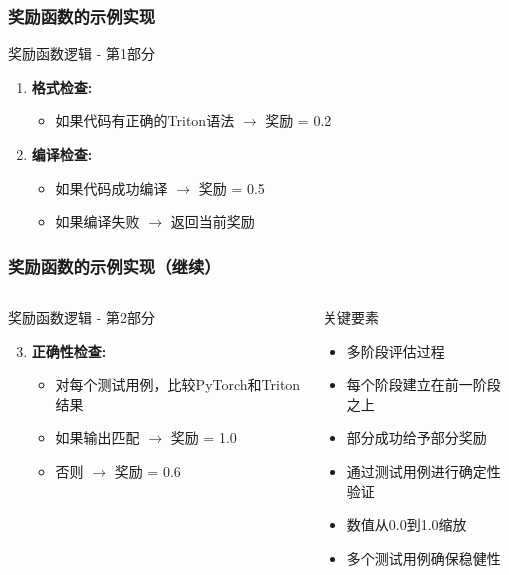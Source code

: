 \documentclass[aspectratio=169]{beamer}
\begin{document}
\begin{frame}
	\frametitle{奖励函数的示例实现}
	\begin{block}{奖励函数逻辑 - 第1部分}
		\begin{enumerate}
			\item \textbf{格式检查:}
			\begin{itemize}
				\item 如果代码有正确的Triton语法 $\rightarrow$ 奖励 = 0.2
			\end{itemize}
			\item \textbf{编译检查:}
			\begin{itemize}
				\item 如果代码成功编译 $\rightarrow$ 奖励 = 0.5
				\item 如果编译失败 $\rightarrow$ 返回当前奖励
			\end{itemize}
		\end{enumerate}
	\end{block}
\end{frame}

\begin{frame}
	\frametitle{奖励函数的示例实现（继续）}
	\begin{columns}
		\begin{column}{0.48\textwidth}
			\begin{block}{奖励函数逻辑 - 第2部分}
				\begin{enumerate}\setcounter{enumi}{2}
					\item \textbf{正确性检查:}
					\begin{itemize}
						\item 对每个测试用例，比较PyTorch和Triton结果
						\item 如果输出匹配 $\rightarrow$ 奖励 = 1.0
						\item 否则 $\rightarrow$ 奖励 = 0.6
					\end{itemize}
				\end{enumerate}
			\end{block}
		\end{column}
		\begin{column}{0.48\textwidth}
			\begin{block}{关键要素}
				\begin{itemize}
					\item 多阶段评估过程
					\item 每个阶段建立在前一阶段之上
					\item 部分成功给予部分奖励
					\item 通过测试用例进行确定性验证
					\item 数值从0.0到1.0缩放
					\item 多个测试用例确保稳健性
				\end{itemize}
			\end{block}
		\end{column}
	\end{columns}
\end{frame}
\end{document}
